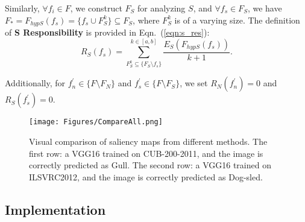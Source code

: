 Similarly, $\forall f_i \in F$, we construct $F_S$ for analyzing $S$, and $\forall f_s \in F_S$, we have $F_*=F_{hypS}(f_s) = \{f_s \cup F_{S}^k\} \subseteq F_S$, where $F_{S}^k$ is of a varying size.
The definition of \textbf{S Responsibility} is provided in Eqn.~(\ref{eqn:s_res}):
\begin{equation}\label{eqn:s_res}
    R_S(f_s)=\sum_{F_S^k\subseteq \{F_S \setminus f_s\}}^{k \in [a,b] }  \frac{E_S(F_{hypS}(f_s))} {k+1}.
\end{equation}

Additionally, for $f_n^\prime \in \{F\setminus F_N\}$ and $f_s^\prime \in \{F\setminus F_S\}$, we set $R_N(f_n^\prime) = 0$ and $R_S(f_s^\prime) = 0$.

\begin{figure*}[htbp]
  \centering
   \texttt{[image: Figures/CompareAll.png]}
\caption{Visual comparison of saliency maps from different methods. The first row: a VGG16 trained on CUB-200-2011, and the image is correctly predicted as {\selectfont Gull}. The second row: a VGG16 trained on ILSVRC2012, and the image is correctly predicted as {\selectfont Dog-sled}.
}
   \label{fig:Compare all}
\end{figure*}

\subsection{\textbf{\name{}} Implementation}


